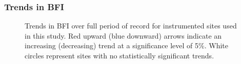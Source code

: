 \documentclass[
]{agujournal2019}
\begin{document}
\subsubsection{Trends in BFI}\label{sec-bfi-trends}

\begin{figure}


\caption{\label{fig-instrumented-trend}Trends in BFI over full period of
record for instrumented sites used in this study. Red upward (blue
downward) arrows indicate an increasing (decreasing) trend at a
significance level of 5\%. White circles represent sites with no
statistically significant trends.}

\end{figure}%
\end{document}
